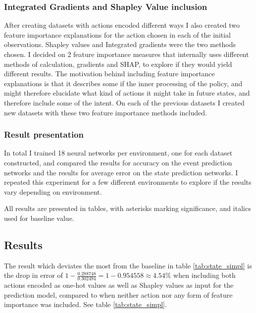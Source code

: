\documentclass[UKenglish]{uiomasterthesis}
\begin{document}
\subsubsection{Integrated Gradients and Shapley Value inclusion}
After creating datasets with actions encoded different ways I also created two feature importance explanations for the action chosen in each of the initial observations. Shapley values and Integrated gradients were the two methods chosen. I decided on 2 feature importance measures that internally uses different methods of calculation, gradients and SHAP, to explore if they would yield different results. The motivation behind including feature importance explanations is that it describes some if the inner processing of the policy, and might therefore elucidate what kind of actions it might take in future states, and therefore include some of the intent. On each of the previous datasets I created new datasets with these two feature importance methods included.\\

\subsubsection{Result presentation}
In total I trained 18 neural networks per environment, one for each dataset constructed, and compared the results for accuracy on the event prediction networks and the results for average error on the state prediction networks. I repeated this experiment for a few different environments to explore if the results vary depending on environment.

All results are presented in tables, with asterisks marking significance, and italics used for baseline value.

\begin{figure}[!ht]
	
	\label{fig:pred_loss_action_ig} 
\end{figure}

\subsection{Results}

The result which deviates the most from the baseline in table \ref{tab:state_simpl} is the drop in error of $1 - \frac{0.288748}{0.302494} = 1 - 0.954558 \approx 4.54\%$ when including both actions encoded as one-hot values as well as Shapley values as input for the prediction model, compared to when neither action nor any form of feature importance was included. See table \ref{tab:state_simpl}.
\end{document}

